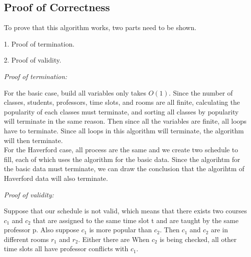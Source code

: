 \documentclass[11pt, oneside]{article}   	%
\begin{document}
\subsection{Proof of Correctness}
To prove that this algorithm works, two parts need to be shown.

1. Proof of termination.

2. Proof of validity.

\textit{Proof of termination:}

For the basic case, build all variables only takes $O(1)$. Since the number of classes, students, professors, time slots, and rooms are all finite, calculating the popularity of each classes must terminate, and sorting all classes by popularity will terminate in the same reason. Then since all the variables are finite, all loops have to terminate. Since all loops in this algorithm will terminate, the algorithm will then terminate. \\

For the Haverford case, all process are the same and we create two schedule to fill, each of which uses the algorithm for the basic data. Since the algorihtm for the basic data must terminate, we can draw the conclusion that the algorihtm of Haverford data will also terminate.

\textit{Proof of validity:}

Suppose that our schedule is not valid, which means that there exists two courses $c_1$ and $c_2$ that are assigned to the same time slot t and are taught by the same professor p. Also suppose $c_1$ is more popular than $c_2$. Then $c_1$ and $c_2$ are in different rooms $r_1$ and $r_2$. 
Either there are 
When $c_2$ is being checked, all other time slots all have professor conflicts with $c_1$.

\end{document}

